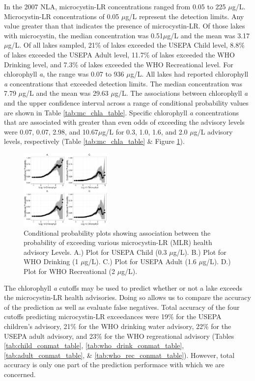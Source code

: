 \documentclass[10pt,a4paper,twocolumn]{article}
\begin{document}
In the 2007 NLA, microcystin-LR concentrations ranged from 0.05 to 225
\(\mu\)g/L. Microcystin-LR concentrations of 0.05 \(\mu\)g/L represent
the detection limits. Any value greater than that indicates the presence
of microcystin-LR. Of those lakes with microcystin, the median
concentration was 0.51\(\mu\)g/L and the mean was 3.17\(\mu\)g/L. Of all
lakes sampled, 21\% of lakes exceeded the USEPA Child level, 8.8\% of
lakes exceeded the USEPA Adult level, 11.7\% of lakes exceeded the WHO
Drinking level, and 7.3\% of lakes exceeded the WHO Recreational level.
For chlorophyll \emph{a}, the range was 0.07 to 936 \(\mu\)g/L. All
lakes had reported chlorophyll \emph{a} concentrations that exceeded
detection limits. The median concentration was 7.79 \(\mu\)g/L and the
mean was 29.63 \(\mu\)g/L. The associations between chlorophyll \emph{a}
and the upper confidence interval across a range of conditional
probability values are shown in Table \ref{tab:mc_chla_table}. Specific
chlorophyll \emph{a} concentrations that are associated with greater
than even odds of exceeding the advisory levels were 0.07, 0.07, 2.98,
and 10.67\(\mu\)g/L for 0.3, 1.0, 1.6, and 2.0 \(\mu\)g/L advisory
levels, respectively (Table \ref{tab:mc_chla_table} \& Figure
\ref{fig:multi_cp_plot}).

\begin{figure}
\centering
\includegraphics[width=0.4\textwidth]{hollister_microcystin_fig1.jpg}
\caption{\label{fig:multi_cp_plot}Conditional probability plots showing association between the probability of exceeding various microcystin-LR (MLR) health advisory Levels. A.) Plot for USEPA Child (0.3 $\mu$g/L). B.) Plot for WHO Drinking (1 $\mu$g/L). C.) Plot for USEPA Adult (1.6 $\mu$g/L). D.) Plot for WHO Recreational (2 $\mu$g/L).  }
\end{figure}

The chlorophyll \emph{a} cutoffs may be used to predict whether or not a
lake exceeds the microcystin-LR health advisories. Doing so allows us to
compare the accuracy of the prediction as well as evaluate false
negatives. Total accuracy of the four cutoffs predicting microcystin-LR
exceedances were 19\% for the USEPA children's advisory, 21\% for the
WHO drinking water advisory, 22\% for the USEPA adult advisory, and 23\%
for the WHO regreational advisory (Tables \ref{tab:child_conmat_table},
\ref{tab:who_drink_conmat_table}, \ref{tab:adult_conmat_table}, \&
\ref{tab:who_rec_conmat_table}). However, total accuracy is only one
part of the prediction performace with which we are concerned.
\end{document}
